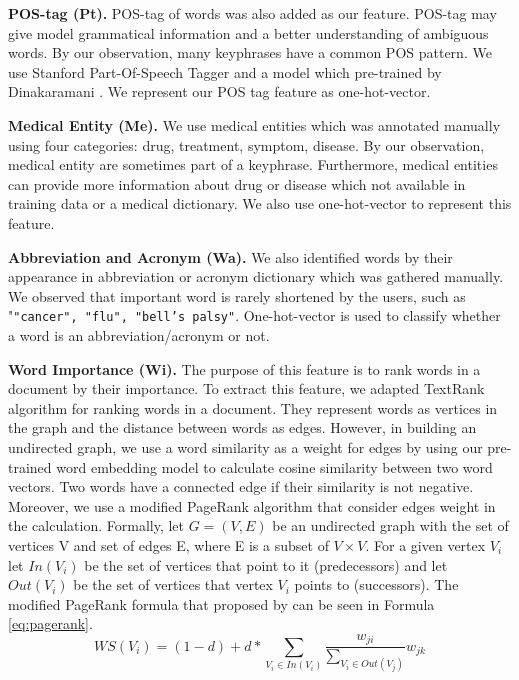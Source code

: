\documentclass[sigconf]{acmart}
\begin{document}
	\textbf{POS-tag (Pt).} POS-tag of words was also added as our feature. POS-tag may give model grammatical information and a better understanding of ambiguous words. By our observation, many keyphrases have a common POS pattern. We use Stanford Part-Of-Speech Tagger and a model which pre-trained by Dinakaramani \cite{dinakaramani2014designing}. We represent our POS tag feature as one-hot-vector.
	
	\textbf{Medical Entity (Me).} We use medical entities which was annotated manually using four categories: drug, treatment, symptom, disease. By our observation, medical entity are sometimes part of a keyphrase. Furthermore, medical entities can provide more information about drug or disease which not available in training data or a medical dictionary. We also use one-hot-vector to represent this feature.
	
	\textbf{Abbreviation and Acronym (Wa).} We also identified words by their appearance in abbreviation or acronym dictionary which was gathered manually. We observed that important word is rarely shortened by the users, such as "\texttt{"cancer", "flu", "bell's palsy"}. One-hot-vector is used to classify whether a word is an abbreviation/acronym or not.
	
	\textbf{Word Importance (Wi).} The purpose of this feature is to rank words in a document by their importance. To extract this feature, we adapted  TextRank \cite{mihalcea2004textrank} algorithm for ranking words in a document. They represent words as vertices in the graph and the distance between words as edges. However, in building an undirected graph, we use a word similarity as a weight for edges by using our pre-trained word embedding model to calculate cosine similarity between two word vectors. Two words have a connected edge if their similarity is not negative. Moreover, we use a modified PageRank \cite{page1999pagerank} algorithm that consider edges weight in the calculation. Formally, let $G = (V, E)$ be an undirected graph with the set of vertices V and set of edges E, where E is a subset of $V \times V$. For a given vertex $V_i$ let $In(V_i)$ be the set of vertices that point to it (predecessors) and let $Out(V_i)$ be the set of vertices that vertex $V_i$ points to (successors). The modified PageRank formula that proposed by \cite{mihalcea2004textrank} can be seen in Formula \ref{eq:pagerank}.
	\begin{equation}\label{eq:pagerank}
	WS(V_{i})=(1-d) + d * \sum_{V_{i} \in In(V_{i})} \frac{w_{ji}}{\sum_{V_{i} \in Out(V_{j})}}w_{jk}
	\end{equation}
	
\end{document}
